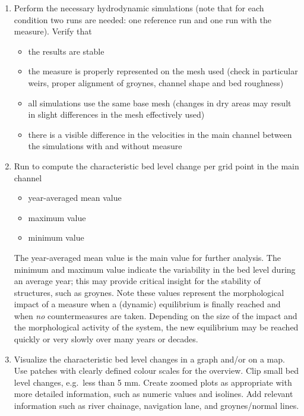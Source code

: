 \begin{enumerate}
\item Perform the necessary hydrodynamic simulations (note that for each condition two runs are needed: one reference run and one run with the measure).
Verify that
\begin{itemize}
\item the \dflowfm results are stable
\item the measure is properly represented on the mesh used (check in particular weirs, proper alignment of groynes, channel shape and bed roughness)
\item all simulations use the same base mesh (changes in dry areas may result in slight differences in the mesh effectively used)
\item there is a visible difference in the velocities in the main channel between the simulations with and without measure
\end{itemize}

\item Run \dfastmi to compute the characteristic bed level change per grid point in the main channel

\begin{itemize}
\item year-averaged mean value 
\item maximum value 
\item minimum value 
\end{itemize}

The year-averaged mean value is the main value for further analysis.
The minimum and maximum value indicate the variability in the bed level during an average year; this may provide critical insight for the stability of structures, such as groynes.
Note these values represent the morphological impact of a measure when a (dynamic) equilibrium is finally reached and when \emph{no} countermeasures are taken.
Depending on the size of the impact and the morphological activity of the system, the new equilibrium may be reached quickly or very slowly over many years or decades.

\item Visualize the characteristic bed level changes in a graph and/or on a map.
Use patches with clearly defined colour scales for the overview.
Clip small bed level changes, e.g.~less than 5 mm.
Create zoomed plots as appropriate with more detailed information, such as numeric values and isolines.
Add relevant information such as river chainage, navigation lane, and groynes/normal lines.


\end{enumerate}
